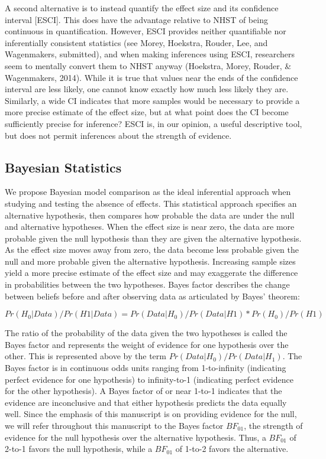 \documentclass[fignum,nobf,man]{apa}
\begin{document}
A second alternative is to instead quantify the effect size and its confidence interval [ESCI]. This does have the advantage relative to NHST of being continuous in quantification.  However, ESCI provides neither quantifiable nor inferentially consistent statistics (see Morey, Hoekstra, Rouder, Lee, and Wagenmakers, submitted), and when making inferences using ESCI, researchers seem to mentally convert them to NHST anyway (Hoekstra, Morey, Rouder, \& Wagenmakers, 2014). While it is true that values near the ends of the confidence interval are less likely, one cannot know exactly how much less likely they are. Similarly, a wide CI indicates that more samples would be necessary to provide a more precise estimate of the effect size, but at what point does the CI become sufficiently precise for inference? ESCI is, in our opinion, a useful descriptive tool, but does not permit inferences about the strength of evidence.

\subsection{Bayesian Statistics }
We propose Bayesian model comparison as the ideal inferential approach when studying and testing the absence of effects. This statistical approach specifies an alternative hypothesis, then compares how probable the data are under the null and alternative hypotheses. When the effect size is near zero, the data are more probable given the null hypothesis than they are given the alternative hypothesis. As the effect size moves away from zero, the data become less probable given the null and more probable given the alternative hypothesis.  Increasing sample sizes yield a more precise estimate of the effect size and may exaggerate the difference in probabilities between the two hypotheses. Bayes factor describes the change between beliefs before and after observing data as articulated by Bayes’ theorem:

\begin{equation}
Pr(H_0 | Data) / Pr(H1 | Data) = Pr(Data | H_0) / Pr(Data | H1) * Pr(H_0) / Pr (H1) 
\end{equation}

The ratio of the probability of the data given the two hypotheses is called the Bayes factor and represents the weight of evidence for one hypothesis over the other. This is represented above by the term %
$Pr(Data | H_0) / Pr(Data | H_1)$. The Bayes factor is in continuous odds units ranging from 1-to-infinity (indicating perfect evidence for one hypothesis) to infinity-to-1 (indicating perfect evidence for the other hypothesis). A Bayes factor of or near 1-to-1 indicates that the evidence are inconclusive and that either hypothesis predicts the data equally well. Since the emphasis of this manuscript is on providing evidence for the null, we will refer throughout this manuscript to the Bayes factor $BF_{01}$, the strength of evidence for the null hypothesis over the alternative hypothesis. Thus, a $BF_{01}$ of 2-to-1 favors the null hypothesis, while a $BF_{01}$ of 1-to-2 favors the alternative.
\end{document}
